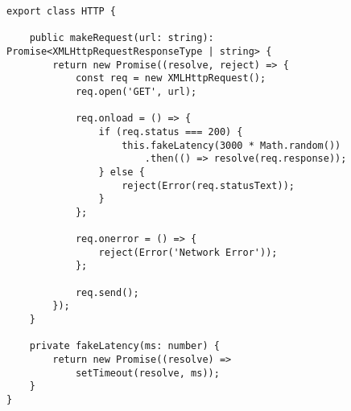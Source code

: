 \begin{figure}[H]
\begin{lstlisting}
export class HTTP {

    public makeRequest(url: string): Promise<XMLHttpRequestResponseType | string> {
        return new Promise((resolve, reject) => {
            const req = new XMLHttpRequest();
            req.open('GET', url);

            req.onload = () => {
                if (req.status === 200) {
                    this.fakeLatency(3000 * Math.random())
                        .then(() => resolve(req.response));
                } else {
                    reject(Error(req.statusText));
                }
            };

            req.onerror = () => {
                reject(Error('Network Error'));
            };

            req.send();
        });
    }

    private fakeLatency(ms: number) {
        return new Promise((resolve) =>
            setTimeout(resolve, ms));
    }
}
\end{lstlisting}
\end{figure}

